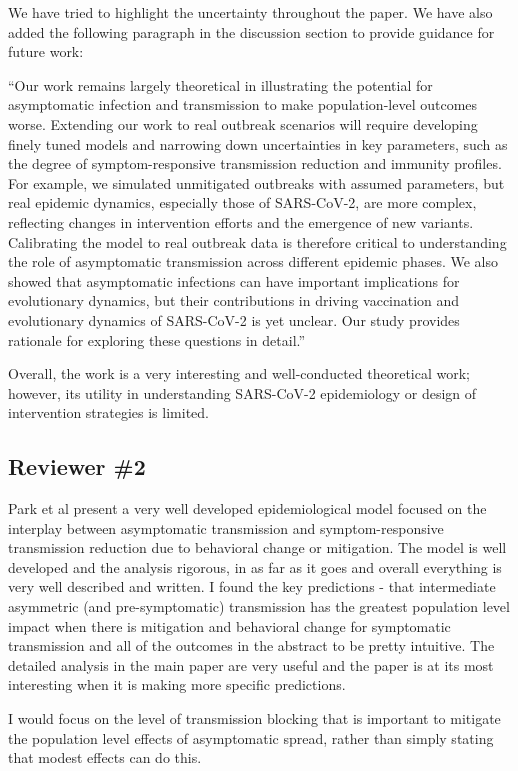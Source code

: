 \documentclass[12pt]{article}
\newcommand{\rev}{\subsection*}
\newcommand{\revtext}{\textsf}
\begin{document}
We have tried to highlight the uncertainty throughout the paper. 
We have also added the following paragraph in the discussion section to provide guidance for future work:

``Our work remains largely theoretical in illustrating the potential for asymptomatic infection and transmission to make population-level outcomes worse.
Extending our work to real outbreak scenarios will require developing finely tuned models and narrowing down uncertainties in key parameters, such as the degree of symptom-responsive transmission reduction and immunity profiles.
For example, we simulated unmitigated outbreaks with assumed parameters, but real epidemic dynamics, especially those of SARS-CoV-2, are more complex, reflecting changes in intervention efforts and the emergence of new variants.
Calibrating the model to real outbreak data is therefore critical to understanding the role of asymptomatic transmission across different epidemic phases.
We also showed that asymptomatic infections can have important implications for evolutionary dynamics, but their contributions in driving vaccination and evolutionary dynamics of SARS-CoV-2 is yet unclear.
Our study provides rationale for exploring these questions in detail.''

\revtext{Overall, the work is a very interesting and well-conducted theoretical work; however, its utility in understanding SARS-CoV-2 epidemiology or design of intervention strategies is limited.}

\rev{Reviewer \#2}

\revtext{Park et al present a very well developed epidemiological model focused on the interplay between asymptomatic transmission and symptom-responsive transmission reduction due to behavioral change or mitigation. The model is well developed and the analysis rigorous, in as far as it goes and overall everything is very well described and written. I found the key predictions - that intermediate asymmetric (and pre-symptomatic) transmission has the greatest population level impact when there is mitigation and behavioral change for symptomatic transmission and all of the outcomes in the abstract to be pretty intuitive. The detailed analysis in the main paper are very useful and the paper is at its most interesting when it is making more specific predictions.}

\revtext{I would focus on the level of transmission blocking that is important to mitigate the population level effects of asymptomatic spread, rather than simply stating that modest effects can do this.}
\end{document}
